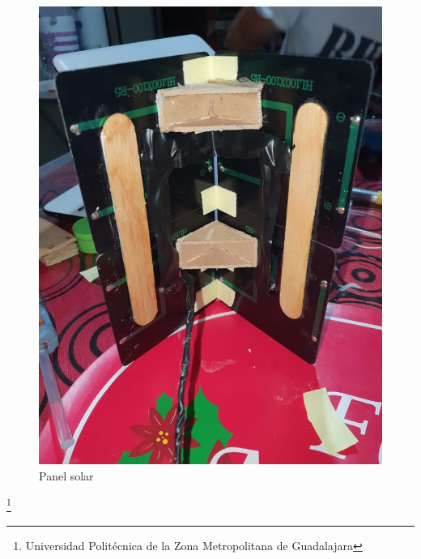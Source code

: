 \documentclass[11pt,a4paper]{article}
\begin{document}
\begin{figure}[hbtp]
\centering
\includegraphics[scale=0.2]{Pictures/Paneles.jpeg}
\caption{Panel solar}
\end{figure}
\footnote{Universidad Politécnica de la Zona Metropolitana de Guadalajara}
\end{document}
